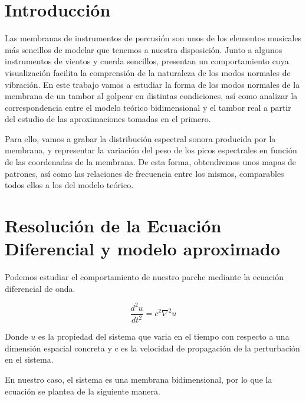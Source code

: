 \documentclass[journal, a4paper,onecolumn]{IEEEtran}
\begin{document}
\vfill
\hspace{0pt}
\pagebreak

\newpage
\tableofcontents
\newpage

\section{Introducción}
Las membranas de instrumentos de percusión son unos de los elementos musicales más sencillos de modelar que tenemos a nuestra disposición. Junto a algunos instrumentos de vientos y cuerda sencillos, presentan un comportamiento cuya visualización facilita la comprensión de la naturaleza de los modos normales de vibración. En este trabajo vamos a estudiar la forma de los modos normales de la membrana de un tambor al golpear en distintas condiciones, así como analizar la correspondencia entre el modelo teórico bidimensional y el tambor real a partir del estudio de las aproximaciones tomadas en el primero.\newline 

Para ello, vamos a grabar la distribución espectral sonora producida por la membrana, y representar la variación del peso de los picos espectrales en función de las coordenadas de la membrana. De esta forma, obtendremos unos mapas de patrones, así como las relaciones de frecuencia entre los mismos, comparables todos ellos a los del modelo teórico. \newline


\section{Resolución de la Ecuación Diferencial y modelo aproximado}
  
Podemos estudiar el comportamiento de nuestro parche mediante la ecuación diferencial de onda.\newline

\begin{equation}
    \frac{d^2 u}{dt^2}=c^2 \nabla ^2 u
\end{equation}
\newline

Donde $u$ es la propiedad del sistema que varia en el tiempo con respecto a una dimensión espacial concreta y c es la velocidad de propagación de la perturbación en el sistema. \newline

En nuestro caso, el sistema es una membrana bidimensional, por lo que la ecuación se plantea de la siguiente manera.\newline
\end{document}
